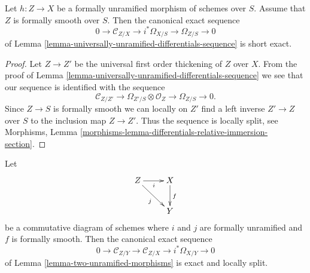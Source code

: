 \begin{lemma}
\label{lemma-differentials-formally-unramified-formally-smooth}
Let $h : Z \to X$ be a formally unramified morphism of schemes over $S$.
Assume that $Z$ is formally smooth over $S$. Then the
canonical exact sequence
$$
0 \to \mathcal{C}_{Z/X} \to i^*\Omega_{X/S} \to \Omega_{Z/S} \to 0
$$
of
Lemma \ref{lemma-universally-unramified-differentials-sequence}
is short exact.
\end{lemma}

\begin{proof}
Let $Z \to Z'$ be the universal first order thickening of $Z$ over $X$.
From the proof of
Lemma \ref{lemma-universally-unramified-differentials-sequence}
we see that our sequence is identified with the sequence
$$
\mathcal{C}_{Z/Z'} \to \Omega_{Z'/S} \otimes \mathcal{O}_Z \to
\Omega_{Z/S} \to 0.
$$
Since $Z \to S$ is formally smooth we can locally on $Z'$ find
a left inverse $Z' \to Z$ over $S$ to the inclusion map $Z \to Z'$.
Thus the sequence is locally split, see
Morphisms, Lemma \ref{morphisms-lemma-differentials-relative-immersion-section}.
\end{proof}

\begin{lemma}
\label{lemma-two-unramified-morphisms-formally-smooth}
Let
$$
\xymatrix{
Z \ar[r]_i \ar[rd]_j & X \ar[d]^f \\
& Y
}
$$
be a commutative diagram of schemes where $i$ and $j$ are formally
unramified and $f$ is formally smooth. Then the canonical exact sequence
$$
0 \to
\mathcal{C}_{Z/Y} \to
\mathcal{C}_{Z/X} \to
i^*\Omega_{X/Y} \to 0
$$
of
Lemma \ref{lemma-two-unramified-morphisms}
is exact and locally split.
\end{lemma}

